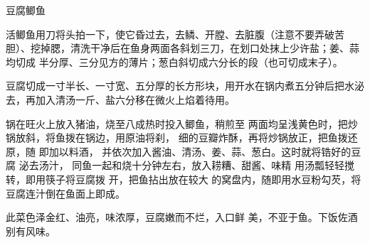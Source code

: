 \begin{recipe}{豆腐鲫鱼}

\ingredients


\preparation

\step 活鲫鱼用刀将头拍一下，使它昏过去，去鳞、开膛、去脏腹（注意不要弄破苦
胆）、挖掉腮，清洗干净后在鱼身两面各斜划三刀，在划口处抹上少许盐；姜、蒜均切成
半分厚、三分见方的薄片；葱白斜切成六分长的段（也可切成末子）。

\step 豆腐切成一寸半长、一寸宽、五分厚的长方形块，用开水在锅内煮五分钟后把水泌
去，再加入清汤一斤、盐六分移在微火上焰着待用。

\step 锅在旺火上放入猪油，烧至八成热时投入鲫鱼，稍煎至 两面均呈浅黄色时，把炒
锅放斜，将鱼拨在锅边，用原油将刹， 细的豆瓣炸酥，再将炒锅放正，把鱼拨还原，随
即加以料酒， 并依次加入酱油、清汤、姜、蒜、葱白。这时就将锆好的豆腐 泌去汤汁，
同鱼一起和烧十分钟左右，放入耢糟、甜酱、味精 用汤瓢轻轻搅转，即用筷子将豆腐拨
开，把鱼拈出放在较大 的窝盘内，随即用水豆粉勾芡，将豆腐连汁倒在鱼面上即成。

\features

此菜色泽金红、油亮，味浓厚，豆腐嫩而不烂，入口鲜 美，不亚于鱼。下饭佐酒别有风味。

\end{recipe}


